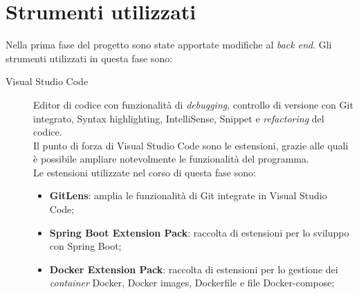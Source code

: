 \section{Strumenti utilizzati}
Nella prima fase del progetto sono state apportate modifiche al \textit{back
      end}. Gli strumenti utilizzati in questa fase sono:
\begin{description}
      \item[Visual Studio Code] Editor di codice con
            funzionalità di \textit{debugging}, controllo di versione con Git
            integrato,
            Syntax highlighting, IntelliSense,
            Snippet e \textit{refactoring} del codice.\\
            Il punto di forza di Visual Studio Code sono le estensioni, grazie
            alle quali è possibile ampliare notevolmente le funzionalità del
            programma.\\
            Le estensioni utilizzate nel corso di questa fase sono:
            \begin{itemize}
                  \item \textbf{GitLens}: amplia le funzionalità di Git
                        integrate in
                        Visual Studio Code;
                  \item \textbf{Spring Boot Extension Pack}: raccolta di
                        estensioni per lo sviluppo con Spring Boot;

                  \item \textbf{Docker Extension Pack}: raccolta di estensioni
                        per lo
                        gestione dei \textit{container} Docker, Docker images,
                        Dockerfile e
                        file
                        Docker-compose;


\end{itemize}
\end{description}
